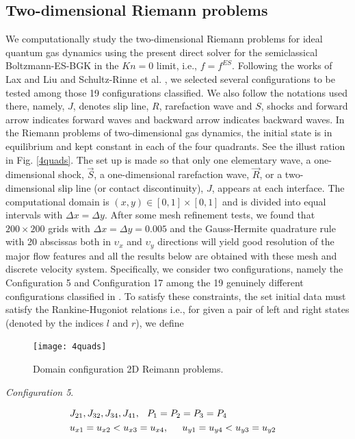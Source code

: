 \documentclass{rsproca}%
\begin{document}
\subsection{Two-dimensional Riemann problems}
\label{Riemannp}
We computationally study the two-dimensional Riemann problems for ideal quantum gas dynamics using the present direct solver for the semiclassical Boltzmann-ES-BGK in the $Kn =0$ limit, i.e., $f=f^{ES}$.  Following the works of Lax and Liu \cite{Laxliu95} and Schultz-Rinne et al. \cite{schultzrinne}, we selected several configurations to be tested among those 19 configurations classified.  We also follow the notations used there, namely, $J$, denotes slip line, $R$, rarefaction wave and $S$, shocks and forward arrow indicates forward waves and backward arrow indicates backward waves. In the Riemann problems of two-dimensional gas dynamics, the initial state is in equilibrium and kept constant in each of the four quadrants. See the illust ration in Fig. \ref{4quads}. The set up is made so that only one elementary wave, a one-dimensional shock, $\vec{S}$, a one-dimensional rarefaction wave, $\vec{R}$, or a two-dimensional slip line (or contact discontinuity), $J$, appears at each interface.  The computational domain is $(x,y) \in [0,1]\times [0,1]$ and is divided into equal intervals with $\Delta x= \Delta y$.  After some mesh refinement tests, we found that $200\times 200$ grids with $\Delta x=\Delta y=0.005$ and the Gauss-Hermite quadrature rule with 20 abscissas both in $\upsilon_x$ and $\upsilon_y$ directions will yield good resolution of the major flow features and all the results below are obtained with these mesh and discrete velocity system.
Specifically, we consider two configurations, namely the Configuration 5 and Configuration 17 among the 19 genuinely different configurations classified in \cite{Laxliu95}\cite{schultzrinne}.    To satisfy these constraints, the set initial data must satisfy the Rankine-Hugoniot relations i.e., for given a pair of left and right states (denoted by the indices $l$ and $r$), we define \\

\begin{figure}
	\centering
	\texttt{[image: 4quads]}
  \caption{Domain configuration 2D Reimann problems.}
  \label{fig:4quads}
\end{figure}

{\em Configuration 5}.

\begin{eqnarray*}
&{J_{21}},J_{32},J_{34},{J_{41}},\hspace{0.1in}P_1=P_2=P_3=P_4&\\
&u_{x1}=u_{x2}<u_{x3}=u_{x4},\hspace{0.2in}u_{y1}=u_{y4}<u_{y3}=u_{y2}&
\label{con5setup}
\end{eqnarray*}
\end{document}
